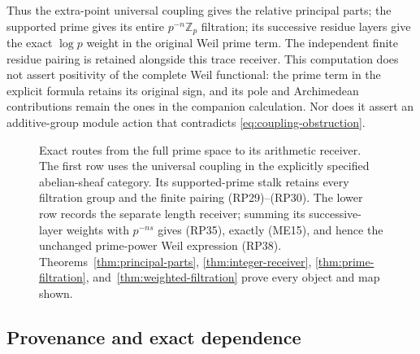 Thus the extra-point universal coupling gives the relative principal
parts; the supported prime gives its entire $p^{-n}\mathbb Z_p$
filtration; its successive residue layers give the exact $\log p$
weight in the original Weil prime term. The independent finite residue
pairing is retained alongside this trace receiver. This computation
does not assert positivity of the complete Weil functional: the prime
term in the explicit formula retains its original sign, and its pole
and Archimedean contributions remain the ones in the companion
calculation. Nor does it assert an additive-group module action that
contradicts \eqref{eq:coupling-obstruction}.

\begin{figure}[ht]
\centering
{}
\medskip
{}
\caption{Exact routes from the full prime space to its arithmetic
receiver. The first row uses the universal coupling in the explicitly
specified abelian-sheaf category. Its supported-prime stalk retains
every filtration group and the finite pairing (RP29)--(RP30).
The lower row records the separate length receiver; summing its
successive-layer weights with $p^{-ns}$ gives (RP35), exactly (ME15),
and hence the unchanged prime-power Weil expression (RP38).
Theorems~\ref{thm:principal-parts}, \ref{thm:integer-receiver},
\ref{thm:prime-filtration}, and~\ref{thm:weighted-filtration}
prove every object and map shown.}
\end{figure}

\subsection{Provenance and exact dependence}

